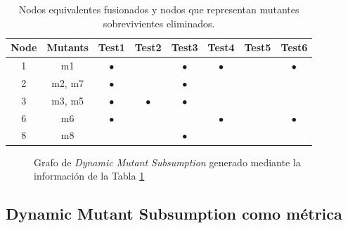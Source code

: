 \begin{table}[]
	\caption[Ejemplo subsunci\'on, matriz de detecci\'on reducida]{Nodos equivalentes fusionados y nodos que representan mutantes sobrevivientes eliminados.}
	\label{tables.examples.subsumptionEquivAndKilled}
	\centering
	\begin{tabular}{|cccccccc|}
		\hline
		Node & Mutants & Test1 & Test2 & Test3 & Test4 & Test5 & Test6 \\ \hline
		1 & m1 & $\bullet$ &  & $\bullet$ & $\bullet$ &  & $\bullet$ \\ \hline
		2 & m2, m7 & $\bullet$ &  & $\bullet$ &  &  &  \\ \hline
		3 & m3, m5 & $\bullet$ & $\bullet$ & $\bullet$ &  &  &  \\ \hline
		6 & m6 & $\bullet$ &  &  & $\bullet$ &  & $\bullet$ \\ \hline
		8 & m8 &  &  & $\bullet$ &  &  &  \\ \hline
	\end{tabular}
\end{table}

\begin{figure}
	\begin{center}
		\usetikzlibrary{positioning}
	\end{center}
	\caption[Grafo de subsunci\'on para la Tabla~\ref{tables.examples.subsumptionEquivAndKilled}]{Grafo de \emph{Dynamic Mutant Subsumption} generado mediante la informaci\'on de la Tabla \ref{tables.examples.subsumptionEquivAndKilled}}
	\label{figures.examples.dynamicSubsumptionGraph}
\end{figure}

\subsection{Dynamic Mutant Subsumption como m\'etrica}
\label{sec:preliminares.mutation.whysubsumption}

